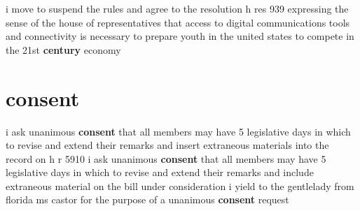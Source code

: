 \documentclass{article}
\begin{document}
\vspace{8mm}
i move to suspend the rules and agree to the resolution h res 939 expressing the sense of the house of representatives that access to digital communications tools and connectivity is necessary to prepare youth in the united states to compete in the 21st {\bf \color{red} century} economy\pagebreak

\section*{consent}
i ask unanimous {\bf \color{red} consent} that all members may have 5 legislative days in which to revise and extend their remarks and insert extraneous materials into the record on h r 5910
\vspace{8mm}
i ask unanimous {\bf \color{red} consent} that all members may have 5 legislative days in which to revise and extend their remarks and include extraneous material on the bill under consideration
\vspace{8mm}
i yield to the gentlelady from florida ms castor for the purpose of a unanimous {\bf \color{red} consent} request\pagebreak
\end{document}
